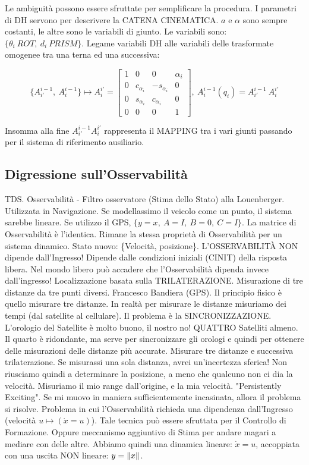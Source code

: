 Le ambiguità possono essere sfruttate per semplificare la procedura. I parametri di DH servono per descrivere la CATENA CINEMATICA. $a$ e $\alpha$ sono sempre costanti, le altre sono le variabili di giunto. Le variabili sono: $\{\theta_i\ ROT,\ d_i\ PRISM\}$. Legame variabili DH alle variabili delle trasformate omogenee tra una terna ed una successiva:

\[
	\{A^{i-1}_{i'},\ A^{i-1}_i\} \mapsto A^{i'}_i = \begin{bmatrix}1&0&0&\alpha_i\\0&c_{\alpha_i}&-s_{\alpha_i}&0\\0&s_{\alpha_i}&c_{\alpha_i}&0\\0&0&0&1\end{bmatrix},\ A^{i-1}_i(q_i) = A^{i-1}_{i'}\ A^{i'}_i
\]

Insomma alla fine $A^{i-1}_{i'}A^{i'}_i$ rappresenta il MAPPING tra i vari giunti passando per il sistema di riferimento ausiliario.

\subsection{Digressione sull'Osservabilità}

TDS. Osservabilità - Filtro osservatore (Stima dello Stato) alla Louenberger. Utilizzata in Navigazione. Se modellassimo il veicolo come un punto, il sistema sarebbe lineare. Se utilizzo il GPS, $\{y=x,\ A=I,\ B=0,\ C=I\}$. La matrice di Osservabilità è l'identica. Rimane la stessa proprietà di Osservabilità per un sistema dinamico. Stato nuovo: \{Velocità, posizione\}. L'OSSERVABILIT\`A NON dipende dall'Ingresso! Dipende dalle condizioni iniziali (CINIT) della risposta libera. Nel mondo libero può accadere che l'Osservabilità dipenda invece dall'ingresso! Localizzazione basata sulla TRILATERAZIONE. Misurazione di tre distanze da tre punti diversi. Francesco Bandiera (GPS). Il principio fisico è quello misurare tre distanze. In realtà per misurare le distanze misuriamo dei tempi (dal satellite al cellulare). Il problema è la SINCRONIZZAZIONE. L'orologio del Satellite è molto buono, il nostro no! QUATTRO Satelliti almeno. Il quarto è ridondante, ma serve per sincronizzare gli orologi e quindi per ottenere delle misurazioni delle distanze più accurate. Misurare tre distanze e successiva trilaterazione. Se misurassi una sola distanza, avrei un'incertezza sferica! Non riusciamo quindi a determinare la posizione, a meno che qualcuno non ci dia la velocità. Misuriamo il mio range dall'origine, e la mia velocità. "Persistently Exciting". Se mi muovo in maniera sufficientemente incasinata, allora il problema si risolve. Problema in cui l'Osservabilità richieda una dipendenza dall'Ingresso (velocità $u\mapsto(\dot{x}=u)$). Tale tecnica può essere sfruttata per il Controllo di Formazione. Oppure meccanismo aggiuntivo di Stima per andare magari a mediare con delle altre. Abbiamo quindi una dinamica lineare: $\dot{x}=u$, accoppiata con una uscita NON lineare: $y=\lVert x\rVert$.

